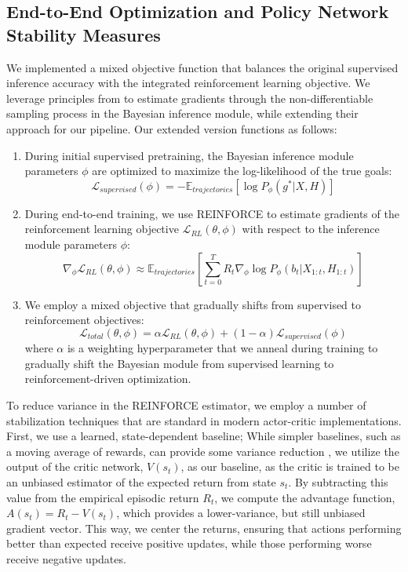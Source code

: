 \documentclass[11pt]{article}
\begin{document}
\subsection{End-to-End Optimization and Policy Network Stability Measures}

We implemented a mixed objective function that balances the original supervised inference accuracy with the integrated reinforcement learning objective. We leverage principles from \cite{williamsRE} to estimate gradients through the non-differentiable sampling process in the Bayesian inference module, while extending their approach for our pipeline. Our extended version functions as follows:

\begin{enumerate}
\item During initial supervised pretraining, the Bayesian inference module parameters $\phi$ are optimized to maximize the log-likelihood of the true goals:
\begin{equation}
\mathcal{L}_{supervised}(\phi) = -\mathbb{E}_{trajectories}\left[\log P_\phi(g^* | X, H)\right]
\end{equation}

\item During end-to-end training, we use REINFORCE to estimate gradients of the reinforcement learning objective $\mathcal{L}_{RL}(\theta, \phi)$ with respect to the inference module parameters $\phi$:
\begin{equation}
\nabla_\phi \mathcal{L}_{RL}(\theta, \phi) \approx \mathbb{E}_{trajectories}\left[\sum_{t=0}^{T} R_t \nabla_\phi \log P_\phi(b_t | X_{1:t}, H_{1:t})\right]
\end{equation}

\item We employ a mixed objective that gradually shifts from supervised to reinforcement objectives:
\begin{equation}
\mathcal{L}_{total}(\theta, \phi) = \alpha \mathcal{L}_{RL}(\theta, \phi) + (1-\alpha) \mathcal{L}_{supervised}(\phi)
\end{equation}
where $\alpha$ is a weighting hyperparameter that we anneal during training to gradually shift the Bayesian module from supervised learning to reinforcement-driven optimization.
\end{enumerate}

To reduce variance in the REINFORCE estimator, we employ a number of stabilization techniques that are standard in modern actor-critic implementations. First, we use a learned, state-dependent baseline; While simpler baselines, such as a moving average of rewards, can provide some variance reduction \cite{greensmith}, we utilize the output of the critic network, $V(s_t)$, as our baseline, as the critic is trained to be an unbiased estimator of the expected return from state $s_t$. By subtracting this value from the empirical episodic return $R_t$, we compute the advantage function, $A(s_t) = R_t - V(s_t)$, which provides a lower-variance, but still unbiased gradient vector. This way, we  center the returns, ensuring that actions performing better than expected receive positive updates, while those performing worse receive negative updates.
\end{document}
